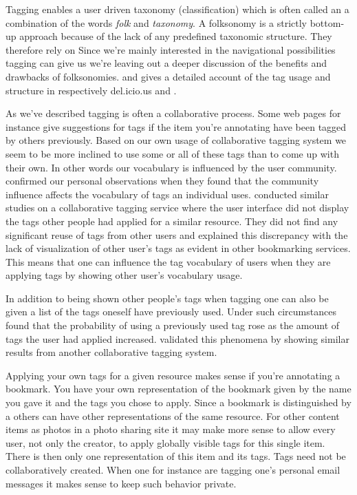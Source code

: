Tagging enables a user driven taxonomy (classification)
which is often called an \dash{}a combination of the words
\emph{folk} and \emph{taxonomy}. A folksonomy is a strictly bottom-up
approach because of the lack of any predefined taxonomic structure. They
therefore rely on 
Since we're mainly interested in the navigational possibilities tagging can
give us we're leaving out a deeper discussion of the benefits and drawbacks
of folksonomies. \citet{golder06} and \citet{marlow06} gives a detailed
account of the tag usage and structure in respectively del.icio.us and
%
.

As we've described tagging is often a collaborative process. Some web pages
for instance give suggestions for tags if the item you're annotating have
been tagged by others previously. Based on our own usage of collaborative
tagging system we seem to be more inclined to use some or all of these tags
than to come up with their own. In other words our vocabulary is influenced
by the user community. \citet[]{sen06} confirmed our personal
observations when they found that the community influence affects the
vocabulary of tags an individual uses. \citet[]{farooq07} conducted
similar studies on a collaborative tagging service where the user interface
did not display the tags other people had applied for a similar resource.
They did not find any significant reuse of tags from other users and explained
this discrepancy with the lack of visualization of other user's tags as
evident in other bookmarking services. This means that one can influence
the tag vocabulary of users when they are applying tags by showing other
user's vocabulary usage.

In addition to being shown other people's tags when tagging one can also
be given a list of the tags oneself have previously used.
Under such circumstances \citet[]{sen06} found that the probability
of using a previously used tag rose as the amount of tags the user had
applied increased. \citet[]{farooq07} validated this phenomena
by showing similar results from another collaborative tagging system.

Applying your own tags for a given resource makes sense if you're annotating a
bookmark. You have your own representation of the bookmark given by the name
you gave it and the tags you chose to apply. Since a bookmark is distinguished
by a  others can have other representations of the same resource.
For other content items as photos in a photo sharing site it may make more
sense to allow every user, not only the creator, to apply globally visible
tags for this single item. There is then only one representation of this item
and its tags.
Tags need not be collaboratively created. When one for instance are tagging
one's personal email messages it makes sense to keep such behavior private.

